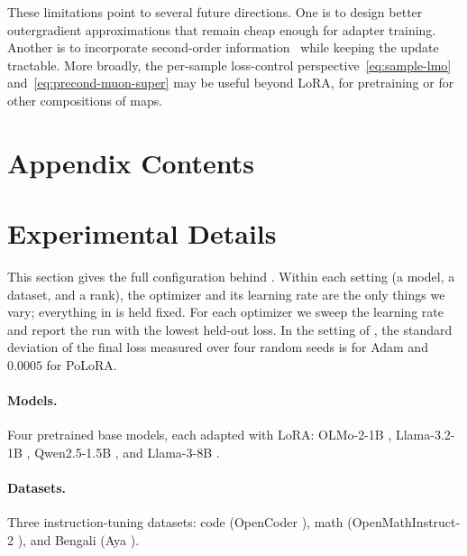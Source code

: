 \documentclass{article}
\newcommand{\methodname}{PoLoRA\xspace}
\newcommand{\nikhil}[1]{\todo[inline]{\textbf{Nikhil: }#1}}
\begin{document}
These limitations point to several future directions. One is to design better outergradient approximations that remain cheap enough for adapter training. Another is to incorporate second-order information~\cite{du2026newtonmuonoptimizer} while keeping the update tractable. More broadly, the per-sample loss-control perspective~\eqref{eq:sample-lmo} and~\eqref{eq:precond-muon-super} may be useful beyond LoRA, for pretraining or for other compositions of maps.

\printbibliography


\clearpage
\appendix
\startcontents[app]
\section*{Appendix Contents}
\clearpage
\section{Experimental Details}
\label{app:exp}
This section gives the full configuration behind . Within each setting (a model, a dataset, and a rank), the optimizer and its learning rate are the only things we vary; everything in  is held fixed. For each optimizer we sweep the learning rate and report the run with the lowest held-out loss. In the setting of , the standard deviation of the final loss measured over four random seeds is \nikhil{TBD: Adam seeds running} for Adam and $0.0005$ for \methodname{}.

\paragraph{Models.} Four pretrained base models, each adapted with LoRA: OLMo-2-1B \cite{olmo2}, Llama-3.2-1B \cite{llama3}, Qwen2.5-1.5B \cite{qwen25}, and Llama-3-8B \cite{llama3}.

\paragraph{Datasets.} Three instruction-tuning datasets: code (OpenCoder \cite{opencoder}), math (OpenMathInstruct-2 \cite{openmathinstruct2}), and Bengali (Aya \cite{aya}).
\end{document}
